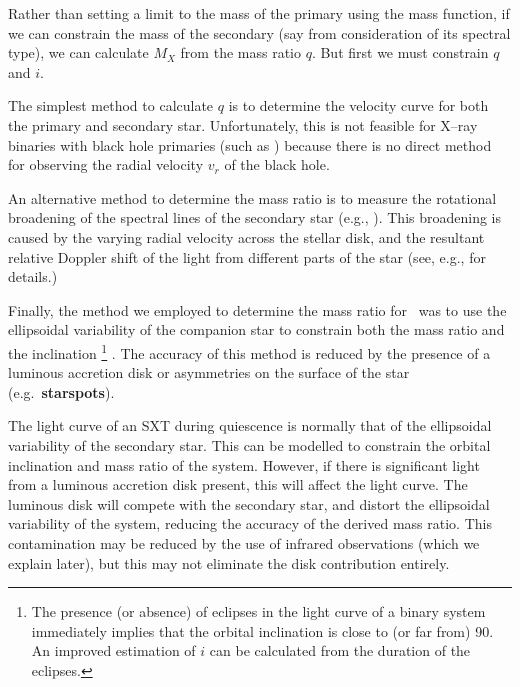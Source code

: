 Rather than setting a limit to the mass of the primary using the mass
function, if we can constrain the mass of the secondary (say from
consideration of its spectral type), we can calculate $M_{X}$ from the
mass ratio $q$. But first we must constrain $q$ and $i$. %

\vspace{\myparskip}

The simplest method to calculate $q$ is to determine the velocity
curve for both the primary and secondary star. Unfortunately, this is
not feasible for X--ray binaries with black hole primaries (such as \groj) because there is no direct method for observing the radial velocity $v_r$ of the black hole. %

\vspace{\myparskip}

An alternative method to determine the mass ratio is to measure the rotational broadening of the spectral lines of the secondary star (e.g., %
%
). This broadening is caused by the varying radial velocity across the
stellar disk, and the resultant relative Doppler shift of the light
from different parts of the star (see, e.g., %
for details.) %

\vspace{\myparskip}

Finally, the method we employed to determine the mass ratio for \groj\ was to use the ellipsoidal variability of the companion star to constrain
both the mass ratio and the inclination%
\footnote{\label{cha:Introduction:sec:X--rayBinaries:subsec:DeterminingTheMassOfThePrimary:foot:inc}
The presence (or absence) of eclipses in the light curve of a binary system
immediately implies that the orbital inclination is close to (or far from) 90\degr. An improved estimation of $i$ can be calculated from the
duration of the eclipses. %
}%
. The accuracy of this method is
reduced by the presence of a luminous accretion disk or asymmetries on the surface of the star
(e.g.\ \textbf{starspots}). %

\vspace{\myparskip}

The light curve of an SXT during quiescence is normally that of the ellipsoidal variability of the secondary star. This can be modelled to constrain the orbital inclination and mass ratio of the system. However, if there is significant light from a luminous accretion disk
present, this will affect the light curve. The luminous disk will compete with the secondary star, and distort the ellipsoidal variability of the system, reducing the accuracy of the derived mass ratio. This contamination may be reduced by the use of infrared observations (which we explain later), but this may not eliminate the disk contribution entirely.

